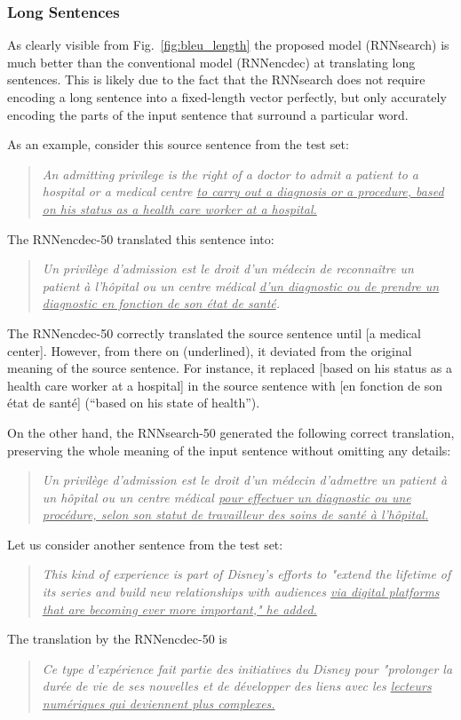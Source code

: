 \documentclass{article} %
\begin{document}
\subsubsection{Long Sentences}

As clearly visible from Fig.~\ref{fig:bleu_length} the proposed model
(RNNsearch) is much better than the conventional model (RNNencdec) at translating
long sentences. This is likely due to the fact that the RNNsearch does not
require encoding a long sentence into a fixed-length vector perfectly, but only
accurately encoding the parts of the input sentence that surround a particular
word.

As an example, consider this source sentence from the test set:
\begin{quote}
    \it
An admitting privilege is the right of a doctor to admit a patient to a hospital
or a medical centre \uline{to carry out a diagnosis or a procedure, based on
his status as a health care worker at a hospital.}
\end{quote}
The RNNencdec-50 translated this sentence into:
\begin{quote}
    \it
Un privilège d'admission est le droit d'un m\'edecin de reconnaître un patient à
l'h\^opital ou un centre m\'edical \uline{d'un diagnostic ou de prendre un diagnostic
en fonction de son \'etat de sant\'e}.
\end{quote}

The RNNencdec-50 correctly translated the source sentence until [a medical center].
However, from there on (underlined), it deviated from the original meaning of
the source sentence. For instance, it replaced [based on his status as a health
care worker at a hospital] in the source sentence with [en fonction de son
\'etat de sant\'e] (``based on his state of health'').

On the other hand, the RNNsearch-50 generated the following correct translation,
preserving the whole meaning of the input sentence without omitting any details:
\begin{quote}
{    \it
Un privilège d'admission est le droit d'un m\'edecin d'admettre un patient à un
h\^opital ou un centre m\'edical \uline{pour effectuer un diagnostic ou une
proc\'edure, selon son statut de travailleur des soins de sant\'e à
l'h\^opital.}}
\end{quote}

Let us consider another sentence from the test set:
\begin{quote}
{    \it
This kind of experience is part of Disney's efforts to "extend the lifetime of
its series and build new relationships with audiences \uline{via digital platforms that
are becoming ever more important," he added.} }
\end{quote}
The translation by the RNNencdec-50 is
\begin{quote}
{    \it
Ce type d'exp\'erience fait partie des initiatives du Disney pour "prolonger la
dur\'ee de vie de ses nouvelles et de d\'evelopper des liens avec les
\uline{lecteurs num\'eriques qui deviennent plus complexes.} }
\end{quote}
\end{document}
